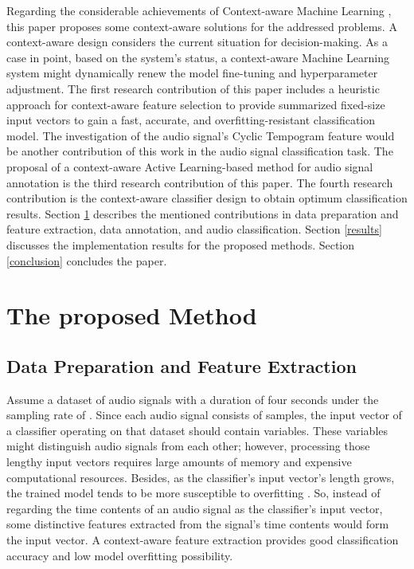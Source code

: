 \documentclass{article}
\begin{document}
Regarding the considerable achievements of Context-aware Machine Learning \citep{Zeng}, this paper proposes some context-aware solutions for the addressed problems. A context-aware design considers the current situation for decision-making. As a case in point, based on the system's status, a context-aware Machine Learning system might dynamically renew the model fine-tuning and hyperparameter adjustment. The first research contribution of this paper includes a heuristic approach for context-aware feature selection to provide summarized fixed-size input vectors to gain a fast, accurate, and overfitting-resistant classification model. The investigation of the audio signal's Cyclic Tempogram feature would be another contribution of this work in the audio signal classification task. The proposal of a context-aware Active Learning-based method for audio signal annotation is the third research contribution of this paper. The fourth research contribution is the context-aware classifier design to obtain optimum classification results. Section \ref{method} describes the mentioned contributions in data preparation and feature extraction, data annotation, and audio classification. Section \ref{results} discusses the implementation results for the proposed methods. Section \ref{conclusion} concludes the paper.

\section{The proposed Method}
\label{method}

\subsection{Data Preparation and Feature Extraction}
\label{ablation}
Assume a dataset of audio signals with a duration of four seconds under the sampling rate of . Since each audio signal consists of  samples, the input vector of a classifier operating on that dataset should contain  variables. These variables might distinguish audio signals from each other; however, processing those lengthy input vectors requires large amounts of memory and expensive computational resources. Besides, as the classifier's input vector's length grows, the trained model tends to be more susceptible to overfitting \citep{Elements}. So, instead of regarding the time contents of an audio signal as the classifier's input vector, some distinctive features extracted from the signal's time contents would form the input vector. A context-aware feature extraction provides good classification accuracy and low model overfitting possibility. 
\end{document}
